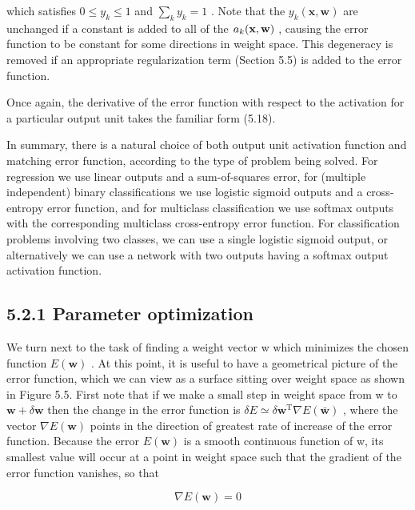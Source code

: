 \documentclass[
  10
]{article}
\begin{document}
which satisfies \(0 \leqslant y _ { k } \leqslant 1\) and
\(\textstyle \sum _ { k } y _ { k } = 1\) . Note that the
\(y _ { k } ( \mathbf { x } , \mathbf { w } )\) are unchanged if a
constant is added to all of the \(a _ { k } ( { \bf x } , { \bf w } )\)
, causing the error function to be constant for some directions in
weight space. This degeneracy is removed if an appropriate
regularization term (Section 5.5) is added to the error function.

Once again, the derivative of the error function with respect to the
activation for a particular output unit takes the familiar form (5.18).

In summary, there is a natural choice of both output unit activation
function and matching error function, according to the type of problem
being solved. For regression we use linear outputs and a sum-of-squares
error, for (multiple independent) binary classifications we use logistic
sigmoid outputs and a cross-entropy error function, and for multiclass
classification we use softmax outputs with the corresponding multiclass
cross-entropy error function. For classification problems involving two
classes, we can use a single logistic sigmoid output, or alternatively
we can use a network with two outputs having a softmax output activation
function.

\subsection{5.2.1 Parameter optimization}\label{parameter-optimization}

We turn next to the task of finding a weight vector w which minimizes
the chosen function \(E ( \mathbf { w } )\) . At this point, it is
useful to have a geometrical picture of the error function, which we can
view as a surface sitting over weight space as shown in Figure 5.5.
First note that if we make a small step in weight space from w to
\(\mathbf { w } + \delta \mathbf { w }\) then the change in the error
function is
\(\delta E \simeq \delta \mathbf { w } ^ { \mathrm { T } } \nabla E ( \mathbf { \bar { w } } )\)
, where the vector \(\nabla E ( \mathbf { w } )\) points in the
direction of greatest rate of increase of the error function. Because
the error \(E ( \mathbf { w } )\) is a smooth continuous function of w,
its smallest value will occur at a point in weight space such that the
gradient of the error function vanishes, so that

\[
\nabla E (\mathbf {w}) = 0\tag{5.26}
\]
\end{document}
